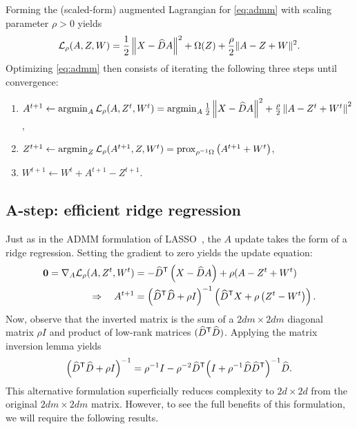 \documentclass{article} %
\begin{document}
Forming the (scaled-form) augmented Lagrangian for \eqref{eq:admm} with scaling
parameter $\rho > 0 $ yields
\[
\mathcal{L}_\rho(A,Z,W) = \frac{1}{2}\left\|X - \widehat{D}A\right\|^2 + \Omega(Z) +
\frac{\rho}{2}\|A - Z + W\|^2.
\]
Optimizing \eqref{eq:admm} then consists of iterating the following three steps until
convergence:
\begin{enumerate}
\item $A^{t+1} \leftarrow \operatorname*{argmin}_A \mathcal{L}_\rho(A, Z^t, W^t) = \operatorname*{argmin}_A \frac{1}{2}
\left\|X - \widehat{D}A\right\|^2 + \frac{\rho}{2}\left\|A - Z^t + W^t\right\|^2$,
\item $Z^{t+1} \leftarrow \operatorname*{argmin}_Z \mathcal{L}_\rho(A^{t+1}, Z, W^t) =
\operatorname*{prox}_{\rho^{-1}\Omega}\left(A^{t+1} + W^t \right)$,
\item $W^{t+1} \leftarrow W^t + A^{t+1} - Z^{t+1}$.
\end{enumerate}

\subsection{A-step: efficient ridge regression}
Just as in the ADMM formulation of LASSO~\cite[chapter 6.4]{boyd2011}, the $A$ update 
takes the form of a ridge regression.  Setting the gradient to zero yields the update
equation:
\begin{align}
\mathbf{0} = \nabla_A \mathcal{L}_\rho(A, Z^t, W^t) &= -\widehat{D}^\mathsf{T} \left(X - \widehat{D}A\right)
+ \rho(A - Z^t + W^t)\notag\\
\Rightarrow \quad A^{t+1} &= {\left(\widehat{D}^\mathsf{T} \widehat{D} + \rho I\right)}^{-1}
\left(\widehat{D}^\mathsf{T} X + \rho \left(Z^t - W^t\right)\right).\label{eq:a-update}
\end{align}
Now, observe that the inverted matrix is the sum of a $2dm\times 2dm$ diagonal matrix 
$\rho I$ and product of low-rank matrices $(\widehat{D}^\mathsf{T}\widehat{D})$.  
Applying the matrix inversion lemma yields
\begin{equation}
{\left(\widehat{D}\ensuremath{^\mathsf{T}}\widehat{D} + \rho I\right)}^{-1} = \rho^{-1} I - \rho^{-2} \widehat{D}^\mathsf{T}
{\left(I + \rho^{-1} \widehat{D}\widehat{D}^\mathsf{T} \right)}^{-1}
\widehat{D}.\label{eq:inversion}
\end{equation}
This alternative formulation superficially reduces complexity to $2d\times 2d$
from the original $2dm\times 2dm$ matrix.  However, to see the full
benefits of this formulation, we will require the following results.
\end{document}
